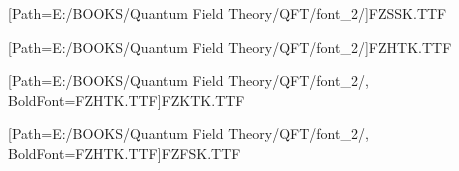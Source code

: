 
[Path={E:/BOOKS/Quantum Field Theory/QFT/font_2/}]{FZSSK.TTF}

[Path={E:/BOOKS/Quantum Field Theory/QFT/font_2/}]{FZHTK.TTF}

[Path={E:/BOOKS/Quantum Field Theory/QFT/font_2/}, BoldFont={FZHTK.TTF}]{FZKTK.TTF}

[Path={E:/BOOKS/Quantum Field Theory/QFT/font_2/}, BoldFont={FZHTK.TTF}]{FZFSK.TTF}


\newcommand*{\songti}{\CJKfamily{zhsong}}

\newcommand*{\heiti}{\CJKfamily{zhhei}}

\newcommand*{\kaishu}{\CJKfamily{zhkai}}

\newcommand*{\fangsong}{\CJKfamily{zhfs}}

